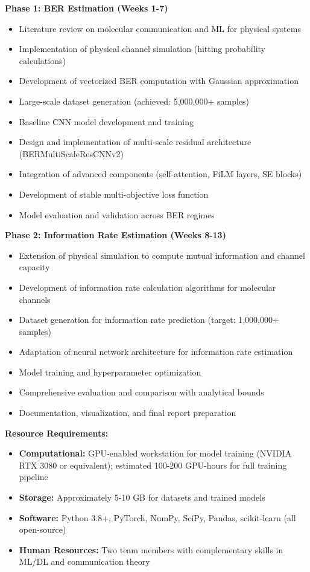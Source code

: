\documentclass[a4paper,12pt]{report}
\begin{document}
\textbf{Phase 1: BER Estimation (Weeks 1-7)}
\begin{itemize}
    \item Literature review on molecular communication and ML for physical systems
    \item Implementation of physical channel simulation (hitting probability calculations)
    \item Development of vectorized BER computation with Gaussian approximation
    \item Large-scale dataset generation (achieved: 5,000,000+ samples)
    \item Baseline CNN model development and training
    \item Design and implementation of multi-scale residual architecture (BERMultiScaleResCNNv2)
    \item Integration of advanced components (self-attention, FiLM layers, SE blocks)
    \item Development of stable multi-objective loss function
    \item Model evaluation and validation across BER regimes
\end{itemize}

\textbf{Phase 2: Information Rate Estimation (Weeks 8-13)}
\begin{itemize}
    \item Extension of physical simulation to compute mutual information and channel capacity
    \item Development of information rate calculation algorithms for molecular channels
    \item Dataset generation for information rate prediction (target: 1,000,000+ samples)
    \item Adaptation of neural network architecture for information rate estimation
    \item Model training and hyperparameter optimization
    \item Comprehensive evaluation and comparison with analytical bounds
    \item Documentation, visualization, and final report preparation
\end{itemize}

\textbf{Resource Requirements:}
\begin{itemize}
    \item \textbf{Computational:} GPU-enabled workstation for model training (NVIDIA RTX 3080 or equivalent); estimated 100-200 GPU-hours for full training pipeline
    \item \textbf{Storage:} Approximately 5-10 GB for datasets and trained models
    \item \textbf{Software:} Python 3.8+, PyTorch, NumPy, SciPy, Pandas, scikit-learn (all open-source)
    \item \textbf{Human Resources:} Two team members with complementary skills in ML/DL and communication theory
\end{itemize}
\end{document}
